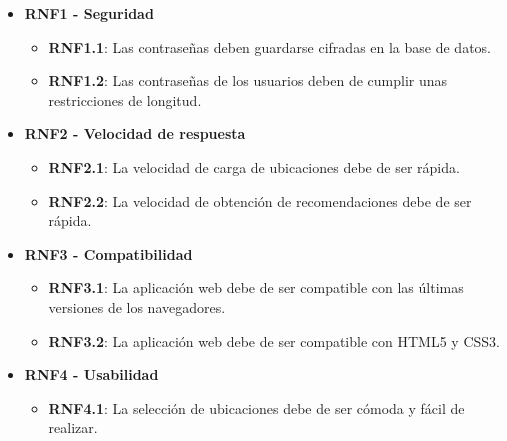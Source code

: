 \begin{itemize}
	\item \textbf{RNF1 - Seguridad}
		\begin{itemize}
			\item \textbf{RNF1.1}: Las contraseñas deben guardarse cifradas en la base de datos.
			\item \textbf{RNF1.2}: Las contraseñas de los usuarios deben de cumplir unas restricciones de longitud.
		\end{itemize}
	\item \textbf{RNF2 - Velocidad de respuesta}
			\begin{itemize}
				\item \textbf{RNF2.1}: La velocidad de carga de ubicaciones debe de ser rápida.
				\item \textbf{RNF2.2}: La velocidad de obtención de recomendaciones debe de ser rápida.
			\end{itemize}
	\item \textbf{RNF3 - Compatibilidad}
		\begin{itemize}
			\item \textbf{RNF3.1}: La aplicación web debe de ser compatible con las últimas versiones de los navegadores.
			\item \textbf{RNF3.2}: La aplicación web debe de ser compatible con HTML5 y CSS3.
		\end{itemize}
	\item \textbf{RNF4 - Usabilidad}
		\begin{itemize}
			\item \textbf{RNF4.1}: La selección de ubicaciones debe de ser cómoda y fácil de realizar.
			
		\end{itemize}
\end{itemize}
